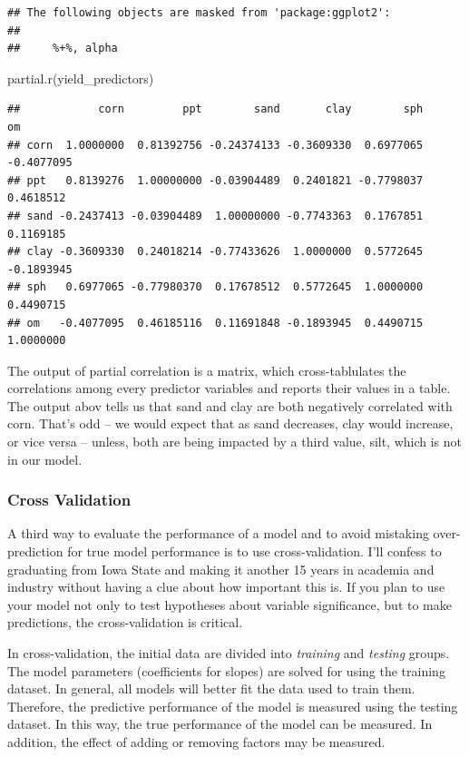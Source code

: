 \documentclass[
]{book}
\newenvironment{Shaded}{\begin{snugshade}}{\end{snugshade}}
\newcommand{\FunctionTok}[1]{\textcolor[rgb]{0.00,0.00,0.00}{#1}}
\newcommand{\NormalTok}[1]{#1}
\begin{document}
\begin{verbatim}
## The following objects are masked from 'package:ggplot2':
## 
##     %+%, alpha
\end{verbatim}

\begin{Shaded}
\begin{Highlighting}[]
\FunctionTok{partial.r}\NormalTok{(yield\_predictors)}
\end{Highlighting}
\end{Shaded}

\begin{verbatim}
##            corn         ppt        sand       clay        sph         om
## corn  1.0000000  0.81392756 -0.24374133 -0.3609330  0.6977065 -0.4077095
## ppt   0.8139276  1.00000000 -0.03904489  0.2401821 -0.7798037  0.4618512
## sand -0.2437413 -0.03904489  1.00000000 -0.7743363  0.1767851  0.1169185
## clay -0.3609330  0.24018214 -0.77433626  1.0000000  0.5772645 -0.1893945
## sph   0.6977065 -0.77980370  0.17678512  0.5772645  1.0000000  0.4490715
## om   -0.4077095  0.46185116  0.11691848 -0.1893945  0.4490715  1.0000000
\end{verbatim}

The output of partial correlation is a matrix, which cross-tablulates the correlations among every predictor variables and reports their values in a table. The output abov tells us that sand and clay are both negatively correlated with corn. That's odd -- we would expect that as sand decreases, clay would increase, or vice versa -- unless, both are being impacted by a third value, silt, which is not in our model.

\hypertarget{cross-validation}{%
\subsubsection{Cross Validation}\label{cross-validation}}

A third way to evaluate the performance of a model and to avoid mistaking over-prediction for true model performance is to use cross-validation. I'll confess to graduating from Iowa State and making it another 15 years in academia and industry without having a clue about how important this is. If you plan to use your model not only to test hypotheses about variable significance, but to make predictions, the cross-validation is critical.

In cross-validation, the initial data are divided into \emph{training} and \emph{testing} groups. The model parameters (coefficients for slopes) are solved for using the training dataset. In general, all models will better fit the data used to train them. Therefore, the predictive performance of the model is measured using the testing dataset. In this way, the true performance of the model can be measured. In addition, the effect of adding or removing factors may be measured.
\end{document}
